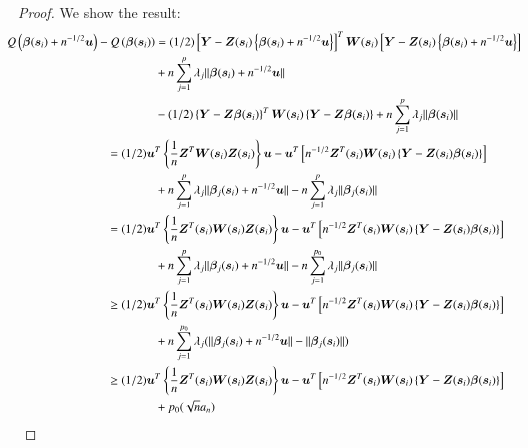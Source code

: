 \documentclass[authoryear, review, 11pt]{elsarticle}
\begin{document}
\begin{proof}
    We show the result:
    \begin{align}\label{eq:consistency}
      \mkern-18mu Q \left( \bm{\beta} (\bm{s}_i) + n^{-1/2} \bm{u} \right) - Q \left( \bm{\beta}(\bm{s}_i) \right) &= (1/2) \left[ \bm{Y} - \bm{Z}(\bm{s}_i) \left\{ \bm{\beta}(\bm{s}_i) + n^{-1/2} \bm{u} \right\} \right]^T \bm{W}(\bm{s}_i) \left[ \bm{Y} - \bm{Z}(\bm{s}_i) \left\{ \bm{\beta}(\bm{s}_i) + n^{-1/2} \bm{u} \right\} \right] \notag \\
      &+ n \sum_{j=1}^p \lambda_j \| \bm{\beta}(\bm{s}_i) + n^{-1/2} \bm{u} \| \notag \\
      &- (1/2) \left\{ \bm{Y} - \bm{Z} \bm{\beta}(\bm{s}_i) \right\}^T \bm{W}(\bm{s}_i) \left\{ \bm{Y} - \bm{Z} \bm{\beta}(\bm{s}_i) \right\} + n \sum_{j=1}^p \lambda_j \| \bm{\beta}(\bm{s}_i) \| \notag \\ 
      &\mkern-72mu= (1/2) \bm{u}^T \left\{ \frac{1}{n} \bm{Z}^T \bm{W}(\bm{s}_i) \bm{Z}(\bm{s}_i) \right\} \bm{u} - \bm{u}^T \left[ n^{-1/2} \bm{Z}^T(\bm{s}_i) \bm{W}(\bm{s}_i) \left\{ \bm{Y} - \bm{Z}(\bm{s}_i) \bm{\beta}(\bm{s}_i) \right\} \right] \notag \\
      &+ n \sum_{j=1}^p \lambda_j \|\bm{\beta}_j(\bm{s}_i) + n^{-1/2} \bm{u} \| - n \sum_{j=1}^p \lambda_j \| \bm{\beta}_j(\bm{s}_i) \| \notag \\
      &\mkern-72mu= (1/2) \bm{u}^T \left\{ \frac{1}{n} \bm{Z}^T(\bm{s}_i) \bm{W}(\bm{s}_i) \bm{Z}(\bm{s}_i) \right\} \bm{u} - \bm{u}^T \left[ n^{-1/2} \bm{Z}^T(\bm{s}_i) \bm{W}(\bm{s}_i) \left\{ \bm{Y} - \bm{Z}(\bm{s}_i) \bm{\beta}(\bm{s}_i) \right\} \right] \notag \\
      &+ n \sum_{j=1}^p \lambda_j \|\bm{\beta}_j(\bm{s}_i) + n^{-1/2} \bm{u} \| - n \sum_{j=1}^{p_0} \lambda_j \| \bm{\beta}_j(\bm{s}_i) \| \notag \\
      &\mkern-72mu\ge (1/2) \bm{u}^T \left\{ \frac{1}{n} \bm{Z}^T(\bm{s}_i) \bm{W}(\bm{s}_i) \bm{Z}(\bm{s}_i) \right\} \bm{u} - \bm{u}^T \left[ n^{-1/2} \bm{Z}^T(\bm{s}_i) \bm{W}(\bm{s}_i) \left\{ \bm{Y} - \bm{Z}(\bm{s}_i) \bm{\beta}(\bm{s}_i) \right\} \right] \notag \\
      &+ n \sum_{j=1}^{p_0} \lambda_j ( \|\bm{\beta}_j(\bm{s}_i) + n^{-1/2} \bm{u} \| - \| \bm{\beta}_j(\bm{s}_i) \| ) \notag \\
      &\mkern-72mu\ge (1/2) \bm{u}^T \left\{ \frac{1}{n} \bm{Z}^T(\bm{s}_i) \bm{W}(\bm{s}_i) \bm{Z}(\bm{s}_i) \right\} \bm{u} - \bm{u}^T \left[ n^{-1/2} \bm{Z}^T(\bm{s}_i) \bm{W}(\bm{s}_i) \left\{ \bm{Y} - \bm{Z}(\bm{s}_i) \bm{\beta}(\bm{s}_i) \right\} \right] \notag \\
      &+ p_0 ( \sqrt{n} a_n )
    \end{align}
  \end{proof}
\end{document}
